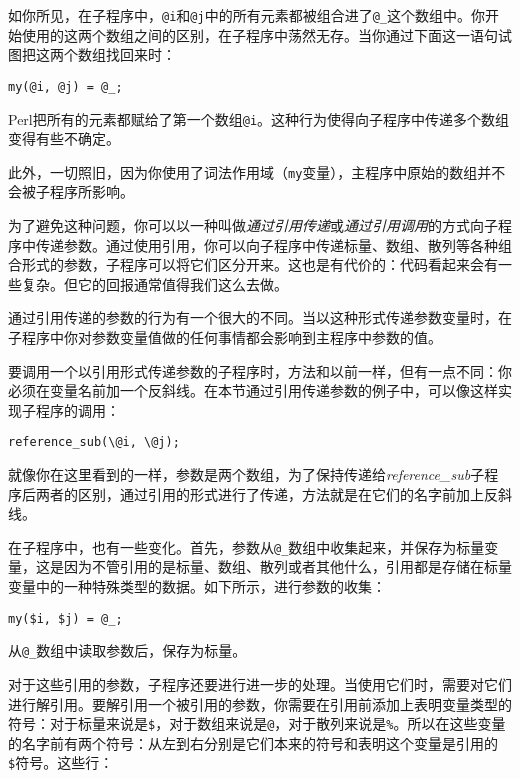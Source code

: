 如你所见，在子程序中，\verb|@i|和\verb|@j|中的所有元素都被组合进了\verb|@_|这个数组中。你开始使用的这两个数组之间的区别，在子程序中荡然无存。当你通过下面这一语句试图把这两个数组找回来时：

\begin{lstlisting}
my(@i, @j) = @_;
\end{lstlisting}

Perl把所有的元素都赋给了第一个数组\verb|@i|。这种行为使得向子程序中传递多个数组变得有些不确定。

此外，一切照旧，因为你使用了词法作用域（\verb|my|变量），主程序中原始的数组并不会被子程序所影响。

为了避免这种问题，你可以以一种叫做\textit{通过引用传递}或\textit{通过引用调用}的方式向子程序中传递参数。通过使用引用，你可以向子程序中传递标量、数组、散列等各种组合形式的参数，子程序可以将它们区分开来。这也是有代价的：代码看起来会有一些复杂。但它的回报通常值得我们这么去做。

通过引用传递的参数的行为有一个很大的不同。当以这种形式传递参数变量时，在子程序中你对参数变量值做的任何事情都会影响到主程序中参数的值。

要调用一个以引用形式传递参数的子程序时，方法和以前一样，但有一点不同：你必须在变量名前加一个反斜线。在本节通过引用传递参数的例子中，可以像这样实现子程序的调用：

\begin{lstlisting}
reference_sub(\@i, \@j);
\end{lstlisting}

就像你在这里看到的一样，参数是两个数组，为了保持传递给\textit{reference\_sub}子程序后两者的区别，通过引用的形式进行了传递，方法就是在它们的名字前加上反斜线。

在子程序中，也有一些变化。首先，参数从\verb|@_|数组中收集起来，并保存为标量变量，这是因为不管引用的是标量、数组、散列或者其他什么，引用都是存储在标量变量中的一种特殊类型的数据。如下所示，进行参数的收集：

\begin{lstlisting}
my($i, $j) = @_;
\end{lstlisting}


从\verb|@_|数组中读取参数后，保存为标量。

对于这些引用的参数，子程序还要进行进一步的处理。当使用它们时，需要对它们进行解引用。要解引用一个被引用的参数，你需要在引用前添加上表明变量类型的符号：对于标量来说是\verb|$|，对于数组来说是\verb|@|，对于散列来说是\verb|%|。所以在这些变量的名字前有两个符号：从左到右分别是它们本来的符号和表明这个变量是引用的\verb|$|符号。这些行：

